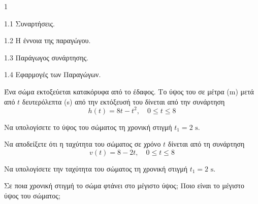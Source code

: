 \begin{ylh}{1}
    \item 1.1 Συναρτήσεις.
    \item 1.2 Η έννοια της παραγώγου.
    \item 1.3 Παράγωγος συνάρτησης.
    \item 1.4 Εφαρμογές των Παραγώγων.
\end{ylh}
Ένα σώμα εκτοξεύεται κατακόρυφα από το έδαφος. Το ύψος του σε μέτρα (m) μετά από $t$ δευτερόλεπτα (s) από την εκτόξευσή του δίνεται από την συνάρτηση
\[
    h(t) = 8t - t^2, \quad 0 \leq t \leq 8
\]
\begin{alist}
    \item Να υπολογίσετε το ύψος του σώματος τη χρονική στιγμή $t_1 = 2 \text{ s}$.
    
    \item Να αποδείξετε ότι η ταχύτητα του σώματος σε χρόνο $t$ δίνεται από τη συνάρτηση
    \[
        v(t) = 8 - 2t, \quad 0 \leq t \leq 8
    \]
    
    \item Να υπολογίσετε την ταχύτητα του σώματος τη χρονική στιγμή $t_1 = 2 \text{ s}$.
    
    \item Σε ποια χρονική στιγμή το σώμα φτάνει στο μέγιστο ύψος; Ποιο είναι το μέγιστο ύψος του σώματος;
\end{alist}

